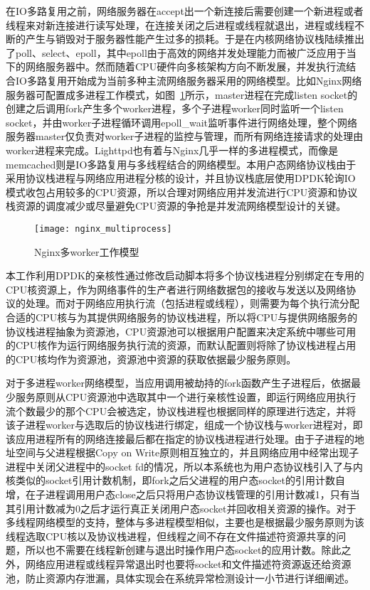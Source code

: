 在IO多路复用之前，网络服务器在accept出一个新连接后需要创建一个新进程或者线程来对新连接进行读写处理，在连接关闭之后进程或线程就退出，进程或线程不断的产生与销毁对于服务器性能产生过多的损耗。于是在内核网络协议栈陆续推出了poll、select、epoll，其中epoll由于高效的网络并发处理能力而被广泛应用于当下的网络服务器中。然而随着CPU硬件向多核架构方向不断发展，并发执行流结合IO多路复用开始成为当前多种主流网络服务器采用的网络模型。比如Nginx网络服务器可配置成多进程工作模式，如图~\ref{fig:nginx_multiprocess}所示，master进程在完成listen socket的创建之后调用fork产生多个worker进程，多个子进程worker同时监听一个listen socket，并由worker子进程循环调用epoll\_wait监听事件进行网络处理，整个网络服务器master仅负责对worker子进程的监控与管理，而所有网络连接请求的处理由worker进程来完成。Lighttpd也有着与Nginx几乎一样的多进程模式，而像是memcached则是IO多路复用与多线程结合的网络模型。本用户态网络协议栈由于采用协议栈进程与网络应用进程分核的设计，并且协议栈底层使用DPDK轮询IO模式收包占用较多的CPU资源，所以合理对网络应用并发流进行CPU资源和协议栈资源的调度减少或尽量避免CPU资源的争抢是并发流网络模型设计的关键。

\vspace{-10pt}
\begin{figure}[H] %
  \centering
  \texttt{[image: nginx\_multiprocess]}
  \caption{Nginx多worker工作模型}
  \label{fig:nginx_multiprocess}
\end{figure}
\vspace{-10pt}

本工作利用DPDK的亲核性通过修改启动脚本将多个协议栈进程分别绑定在专用的CPU核资源上，作为网络事件的生产者进行网络数据包的接收与发送以及网络协议的处理。而对于网络应用执行流（包括进程或线程），则需要为每个执行流分配合适的CPU核与为其提供网络服务的协议栈进程，所以将CPU与提供网络服务的协议栈进程抽象为资源池，CPU资源池可以根据用户配置来决定系统中哪些可用的CPU核作为运行网络服务执行流的资源，而默认配置则将除了协议栈进程占用的CPU核均作为资源池，资源池中资源的获取依据最少服务原则。

对于多进程worker网络模型，当应用调用被劫持的fork函数产生子进程后，依据最少服务原则从CPU资源池中选取其中一个进行亲核性设置，即运行网络应用执行流个数最少的那个CPU会被选定，协议栈进程也根据同样的原理进行选定，并将该子进程worker与选取后的协议栈进行绑定，组成一个协议栈与worker进程对，即该应用进程所有的网络连接最后都在指定的协议栈进程进行处理。由于子进程的地址空间与父进程根据Copy on Write原则相互独立的，并且网络应用中经常出现子进程中关闭父进程中的socket fd的情况，所以本系统也为用户态协议栈引入了与内核类似的socket引用计数机制，即fork之后父进程的用户态socket的引用计数自增，在子进程调用用户态close之后只将用户态协议栈管理的引用计数减1，只有当其引用计数减为0之后才运行真正关闭用户态socket并回收相关资源的操作。对于多线程网络模型的支持，整体与多进程模型相似，主要也是根据最少服务原则为该线程选取CPU核以及协议栈进程，但线程之间不存在文件描述符资源共享的问题，所以也不需要在线程新创建与退出时操作用户态socket的应用计数。除此之外，网络应用进程或线程异常退出时也要将socket和文件描述符资源返还给资源池，防止资源内存泄漏，具体实现会在系统异常检测设计一小节进行详细阐述。

